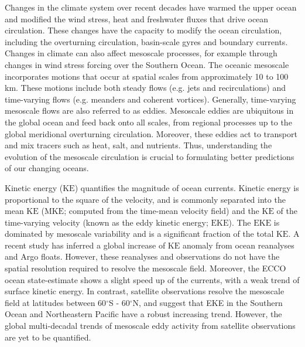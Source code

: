 \documentclass{nature}
\newcommand{\KE}{\text{KE}}
\newcommand{\MKE}{\text{MKE}}
\newcommand{\EKE}{\text{EKE}}
\begin{document}
Changes in the climate system over recent decades have warmed the upper ocean and modified the wind stress, heat and freshwater fluxes that drive ocean circulation\cite{IPCC_2019_ocean,intergovernmental2007climate}. These changes have the capacity to modify the ocean circulation, including the overturning circulation\cite{Marshall_MOC_2017,Toggweiler_circulation_2008},  basin-scale gyres\cite{Yang_shift_2020,Sutton_basin_2007} and boundary currents\cite{Wu_warming_2012,Kwon_BC_atm_2010}. Changes in climate can also affect mesoscale processes, for example through changes in wind stress forcing over the Southern Ocean\cite{Hogg_Recent_2015}. The oceanic mesoscale incorporates motions that occur at spatial scales from approximately 10 to 100 km. These motions include both steady flows (e.g. jets and recirculations) and time-varying flows (e.g. meanders and coherent vortices). Generally, time-varying mesoscale flows are also referred to as eddies. Mesoscale eddies are ubiquitous in the global ocean and feed back onto all scales, from regional processes\cite{Radko_diapycnal_2004} up to the global meridional overturning circulation\cite{Marshall_MOC_2017}. Moreover, these eddies act to transport and mix tracers such as heat, salt, and nutrients\cite{Chelton_The_2011,Early_propagation_2011}. Thus, understanding the evolution of the mesoscale circulation is crucial to formulating better predictions of our changing oceans.

Kinetic energy ($\KE$) quantifies the magnitude of ocean currents\cite{Meredith_Sensitivity_2012,Hogg_Recent_2015,Busecke_mesoscale_2019,Hu_acceleration_2020}. Kinetic energy is proportional to the square of the velocity, and is commonly separated into the mean $\KE$ ($\MKE$; computed from the time-mean velocity field) and the $\KE$ of the time-varying velocity (known as the eddy kinetic energy; $\EKE$). The $\EKE$ is dominated by mesoscale variability and is a significant fraction of the total $\KE$\cite{Wyrtki_Eddy_1976, Chelton_Global_2007}. A recent study has inferred a global increase of $\KE$ anomaly from ocean reanalyses and Argo floats\cite{Hu_acceleration_2020}. However, these reanalyses and observations do not have the spatial resolution required to resolve the mesoscale field. Moreover, the ECCO ocean state-estimate shows a slight speed up of the currents, with a weak trend of surface kinetic energy\cite{Wunsch_speeding_2020}. In contrast, satellite observations resolve the mesoscale field at latitudes between 60$^\circ$S - 60$^\circ$N, and suggest that EKE in the Southern Ocean and Northeastern Pacific have a robust increasing trend\cite{Hogg_Recent_2015,Patara_Variability_2016,Martinez_TKE_2019,Ding_Increased_2017}. However, the global multi-decadal trends of mesoscale eddy activity from satellite observations are yet to be quantified.
\end{document}
